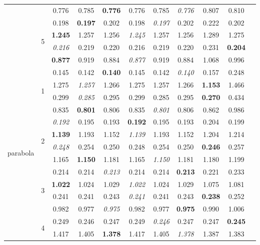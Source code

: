 \documentclass[authoryear, review, 11pt]{elsarticle}
\begin{document}
\begin{table}
\begin{center}
{\begin{tabular}{ccccccccccc}
  &  & 0.776 & 0.785 & \textbf{0.776} & 0.776 & 0.785 & \emph{0.776} & 0.807 & 0.810 \\ 
  \cline{3-10}
  & \multirow{4}{*}{5} & 0.198 & \textbf{0.197} & 0.202 & 0.198 & \emph{0.197} & 0.202 & 0.222 & 0.202 \\ 
  & & \textbf{1.245} & 1.257 & 1.256 & \emph{1.245} & 1.257 & 1.256 & 1.289 & 1.275 \\ 
  & & \emph{0.216} & 0.219 & 0.220 & 0.216 & 0.219 & 0.220 & 0.231 & \textbf{0.204} \\ 
  & & \textbf{0.877} & 0.919 & 0.884 & \emph{0.877} & 0.919 & 0.884 & 1.068 & 0.996 \\ 
  \hline
  \multirow{20}{*}{parabola} & \multirow{4}{*}{1} & 0.145 & 0.142 & \textbf{0.140} & 0.145 & 0.142 & \emph{0.140} & 0.157 & 0.248 \\ 
  & & 1.275 & \emph{1.257} & 1.266 & 1.275 & 1.257 & 1.266 & \textbf{1.153} & 1.466 \\ 
  & & 0.299 & \emph{0.285} & 0.295 & 0.299 & 0.285 & 0.295 & \textbf{0.270} & 0.434 \\ 
  & & 0.835 & \textbf{0.801} & 0.806 & 0.835 & \emph{0.801} & 0.806 & 0.862 & 0.986 \\ 
  \cline{3-10}
  & \multirow{4}{*}{2} & \emph{0.192} & 0.195 & 0.193 & \textbf{0.192} & 0.195 & 0.193 & 0.204 & 0.199 \\ 
  & & \textbf{1.139} & 1.193 & 1.152 & \emph{1.139} & 1.193 & 1.152 & 1.204 & 1.214 \\ 
  & & \emph{0.248} & 0.254 & 0.250 & 0.248 & 0.254 & 0.250 & \textbf{0.246} & 0.257 \\ 
  & & 1.165 & \textbf{1.150} & 1.181 & 1.165 & \emph{1.150} & 1.181 & 1.180 & 1.199 \\ 
  \cline{3-10}
  & \multirow{4}{*}{3} & 0.214 & 0.214 & \emph{0.213} & 0.214 & 0.214 & \textbf{0.213} & 0.221 & 0.233 \\ 
  & & \textbf{1.022} & 1.024 & 1.029 & \emph{1.022} & 1.024 & 1.029 & 1.075 & 1.081 \\ 
  & & 0.241 & 0.241 & 0.243 & \emph{0.241} & 0.241 & 0.243 & \textbf{0.238} & 0.252 \\ 
  & & 0.982 & 0.977 & \emph{0.975} & 0.982 & 0.977 & \textbf{0.975} & 0.990 & 1.006 \\ 
  \cline{3-10}
  & \multirow{4}{*}{4} & 0.249 & 0.246 & 0.247 & 0.249 & \emph{0.246} & 0.247 & 0.247 & \textbf{0.245} \\ 
  & & 1.417 & 1.405 & \textbf{1.378} & 1.417 & 1.405 & \emph{1.378} & 1.387 & 1.383 \\ 

\end{tabular}}
\end{center}
\end{table}
\end{document}
